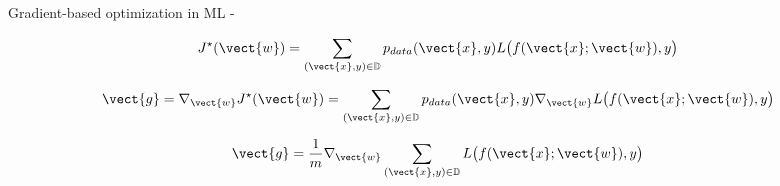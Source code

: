 \begin{frame}[t,allowframebreaks]{
    Gradient-based optimization in ML -}
    \framebreak


    \begin{equation}
        J^{\star}(\vect{w}) =
          \sum_{(\vect{x},y) \in \mathbb{D}} 
          p_{data}(\vect{x},y) L\big(f(\vect{x};\vect{w}),y\big)
    \end{equation}

    \begin{equation}
        \vect{g} = \nabla_{\vect{w}} J^{\star}(\vect{w}) =
          \sum_{(\vect{x},y) \in \mathbb{D}} 
          p_{data}(\vect{x},y) \nabla_{\vect{w}}L\big(f(\vect{x};\vect{w}),y\big)
    \end{equation}

    \begin{equation}
        \vect{g} = \frac{1}{m} \nabla_{\vect{w}}
        \sum_{(\vect{x},y) \in \mathbb{D}} 
        L\big(f(\vect{x};\vect{w}),y\big)
    \end{equation}

\end{frame}

